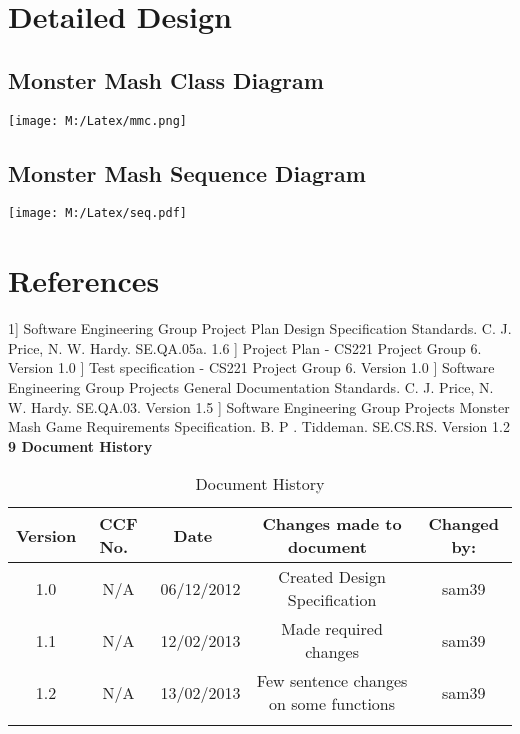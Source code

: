 \documentclass[titlepage]{article}
\begin{document}
\begin{minipage}{\textwidth}

\section{Detailed Design}
\subsection {Monster Mash Class Diagram}

\begin{center}
\texttt{[image: M:/Latex/mmc.png]}
\label{fig:mmclass}
\end{center}

\end{minipage}


\newpage

\begin{minipage}{\textwidth}


\subsection {Monster Mash Sequence Diagram}

\begin{center}
\texttt{[image: M:/Latex/seq.pdf]}
\label{fig:mmseq}
\end{center}

\end{minipage}
\newpage
\section{References}
1] Software Engineering Group Project Plan Design Specification Standards. C. J. Price, N. W. Hardy. SE.QA.05a. 1.6
] Project Plan - CS221 Project Group 6. Version 1.0
] Test specification - CS221 Project Group 6. Version 1.0
] Software Engineering Group Projects General Documentation Standards. C. J. Price, N. W. Hardy. SE.QA.03. Version 1.5
] Software Engineering Group Projects Monster Mash Game Requirements Specification. B. P . Tiddeman. SE.CS.RS. Version 1.2
\newline
\newline
{\Large \bf 9 Document History}
\begin{table*}[h]
\caption{Document History}
\begin{tabular}{c|c|c|c|c}
\hline\hline
Version & CCF No.\ & Date \ & Changes made to document\ & Changed by: \\ [0.5ex]
\hline
1.0 & N/A & 06/12/2012 & Created Design Specification & sam39 \\
\hline
1.1 & N/A & 12/02/2013 & Made required changes & sam39 \\
\hline
1.2 & N/A & 13/02/2013 & Few sentence changes on some functions & sam39 \\
 & & & \\ [1ex]
\hline
\end{tabular}
\label{table:nonlin}
\end{table*}
\end{document}
